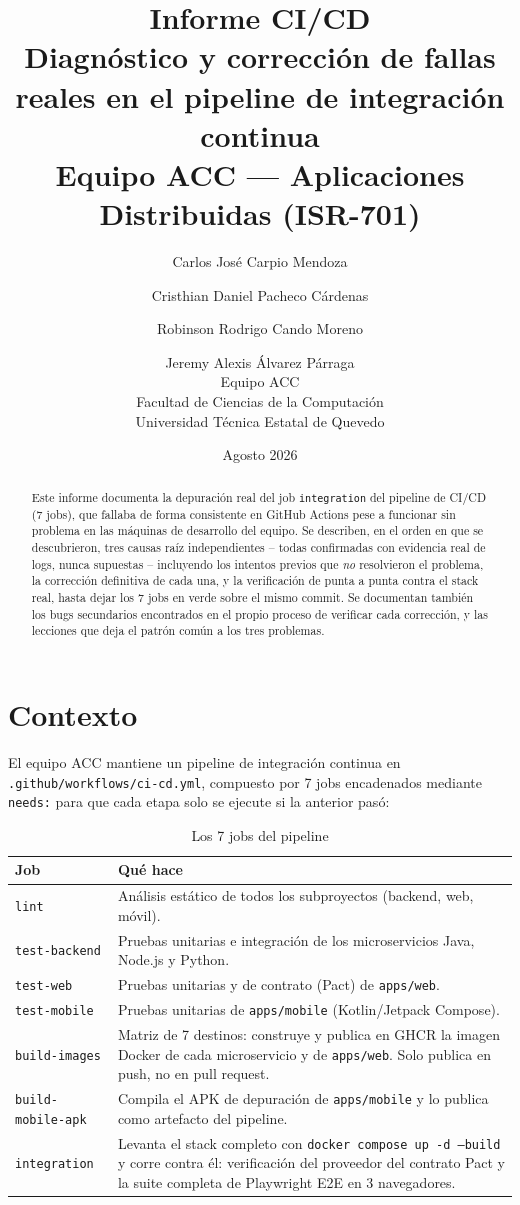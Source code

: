 \documentclass[11pt,letterpaper]{article}
\title{\textbf{Informe CI/CD}\\
\large Diagnóstico y corrección de fallas reales en el pipeline de integración continua\\
\large Equipo ACC --- Aplicaciones Distribuidas (ISR-701)}
\author{
Carlos Jos\'e Carpio Mendoza \and
Cristhian Daniel Pacheco C\'ardenas \and
Robinson Rodrigo Cando Moreno \and
Jeremy Alexis \'Alvarez P\'arraga\\[1em]
\normalsize Equipo ACC\\
\normalsize Facultad de Ciencias de la Computaci\'on\\
\normalsize Universidad T\'ecnica Estatal de Quevedo
}
\date{Agosto 2026}
\begin{document}
\maketitle

\begin{abstract}
\noindent Este informe documenta la depuración real del job \texttt{integration} del pipeline
de CI/CD (7 jobs), que fallaba de forma consistente en GitHub Actions pese a funcionar sin
problema en las máquinas de desarrollo del equipo. Se describen, en el orden en que se
descubrieron, tres causas raíz independientes -- todas confirmadas con evidencia real de logs,
nunca supuestas -- incluyendo los intentos previos que \emph{no} resolvieron el problema, la
corrección definitiva de cada una, y la verificación de punta a punta contra el stack real, hasta
dejar los 7 jobs en verde sobre el mismo commit. Se documentan también los bugs secundarios
encontrados en el propio proceso de verificar cada corrección, y las lecciones que deja el
patrón común a los tres problemas.
\end{abstract}

\tableofcontents
\newpage

\section{Contexto}

El equipo ACC mantiene un pipeline de integración continua en
\texttt{.github/workflows/ci-cd.yml}, compuesto por 7 jobs encadenados mediante \texttt{needs:}
para que cada etapa solo se ejecute si la anterior pasó:

\begin{table}[H]
\centering
\caption{Los 7 jobs del pipeline}
\begin{tabular}{@{}p{3.2cm}p{10.8cm}@{}}
\toprule
\textbf{Job} & \textbf{Qué hace} \\
\midrule
\texttt{lint} & Análisis estático de todos los subproyectos (backend, web, móvil). \\
\texttt{test-backend} & Pruebas unitarias e integración de los microservicios Java, Node.js y
Python. \\
\texttt{test-web} & Pruebas unitarias y de contrato (Pact) de \texttt{apps/web}. \\
\texttt{test-mobile} & Pruebas unitarias de \texttt{apps/mobile} (Kotlin/Jetpack Compose). \\
\texttt{build-images} & Matriz de 7 destinos: construye y publica en GHCR la imagen Docker de
cada microservicio y de \texttt{apps/web}. Solo publica en push, no en pull request. \\
\texttt{build-mobile-apk} & Compila el APK de depuración de \texttt{apps/mobile} y lo publica
como artefacto del pipeline. \\
\texttt{integration} & Levanta el stack completo con \texttt{docker compose up -d --build} y
corre contra él: verificación del proveedor del contrato Pact y la suite completa de Playwright
E2E en 3 navegadores. \\
\bottomrule
\end{tabular}
\end{table}
\end{document}
